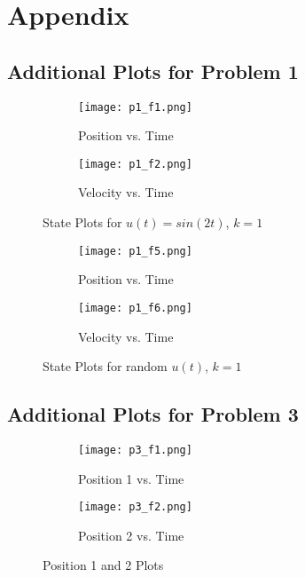 \documentclass{article}
\begin{document}
\section{Appendix}
\subsection{Additional Plots for Problem 1}

    \begin{figure}[h]
    \centering
    \begin{subfigure}{.5\textwidth}
      \centering
      \texttt{[image: p1\_f1.png]}
      \caption{Position vs. Time}
      \label{fig:sub1}
    \end{subfigure}%
    \begin{subfigure}{.5\textwidth}
      \centering
      \texttt{[image: p1\_f2.png]}
      \caption{Velocity vs. Time}
      \label{fig:sub2}
    \end{subfigure}
    \caption{State Plots for $u(t)=sin(2t)$, $k=1$}
    \label{fig:test}
    \end{figure}

        \begin{figure}[h]
    \centering
    \begin{subfigure}{.5\textwidth}
      \centering
      \texttt{[image: p1\_f5.png]}
      \caption{Position vs. Time}
      \label{fig:sub1}
    \end{subfigure}%
    \begin{subfigure}{.5\textwidth}
      \centering
      \texttt{[image: p1\_f6.png]}
      \caption{Velocity vs. Time}
      \label{fig:sub2}
    \end{subfigure}
    \caption{State Plots for random $u(t)$, $k=1$}
    \label{fig:test}
    \end{figure}

\clearpage
\subsection{Additional Plots for Problem 3}

    \begin{figure}[h]
    \centering
    \begin{subfigure}{.5\textwidth}
      \centering
      \texttt{[image: p3\_f1.png]}
      \caption{Position 1 vs. Time}
      \label{fig:sub1}
    \end{subfigure}%
    \begin{subfigure}{.5\textwidth}
      \centering
      \texttt{[image: p3\_f2.png]}
      \caption{Position 2 vs. Time}
      \label{fig:sub2}
    \end{subfigure}
    \caption{Position 1 and 2 Plots}
    \label{fig:test}
    \end{figure}
\end{document}
